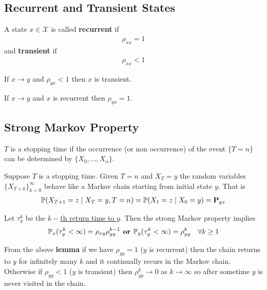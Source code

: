 \documentclass[12pt,a4paper]{article}
\begin{document}
\subsection{Recurrent and Transient States}
\begin{defn}
    \label{recurrent}
    A state $x\in \mathcal{X}$ is called \textbf{recurrent} if 
    \begin{align*}
        \rho_{xx} = 1
    \end{align*}
    and \textbf{transient} if 
    \begin{align*}
        \rho_{xx} < 1
    \end{align*}
\end{defn}
\begin{thm}
    \label{escpath}
    If $x\to y$ and $\rho_{yx} < 1$ then $x$ is transient.
\end{thm}
\begin{thm}
    If $x\to y$ and $x$ is recurrent then $\rho_{yx} = 1$. 
\end{thm}
\newpage
\subsection{Strong Markov Property}
\begin{defn}
    $T$ is a stopping time if the occurrence (or non occurrence) of the event $\{T = n\}$ can be determined by $\{X_0, \ldots, X_n\}$. 
\end{defn}
\begin{thm}
    Suppose $T$ is a stopping time. Given $T = n$ and $X_T = y$ the random variables $\{X_{T+k}\}_{k=0}^\infty$ behave like a Markov chain starting from initial state $y$. That is 
    \begin{align*}
        \P(X_{T+1} = z \given X_T = y, T = n) = \P(X_1 = z\given X_0 = y) =\vb P_{yz}
    \end{align*}
\end{thm}
\begin{lemma}
    Let $\tau_y^k$ be the \hyperref[kthret]{$k-$th return time to $y$}. Then the strong Markov property implies 
    \begin{align*}
        \P_x(\tau_y^k < \infty) = \rho_{xy}\rho_{yy}^{k-1}
        \textbf{ or }
        \P_y(\tau_y^k < \infty) = \rho_{yy}^{k} &&\forall k \geq 1
    \end{align*}
\end{lemma}
\begin{note}
    From the above \textbf{lemma} if we have $\rho_{yy} = 1$ ($y$ is recurrent) then the chain returns to $y$ for infinitely many $k$ and it continually
    recurs in the Markov chain.\\
    Otherwise if $\rho_{yy} < 1$ ($y$ is transient) then $\rho_{yy}^k \to 0$ as $k\to \infty$ so after sometime $y$ is never visited in the chain.  
\end{note}
\newpage
\end{document}
